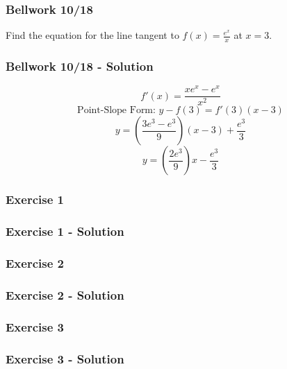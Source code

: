 \documentclass[12pt]{beamer}
\begin{document}
\begin{frame}
	\frametitle{Bellwork 10/18}
	\initclock

	\vfill
	\vfill
	\vfill
	\vfill
	\vfill
	\Large
	Find the equation for the line tangent to $f(x)=\frac{e^x}{x}$ at $x = 3$.
	\vfill
	\vfill
	\vfill
	\vfill
	\vfill
	\vfill
	\vfill
	\vfill

	\small
	\crono
\end{frame}
\begin{frame}
	\frametitle{Bellwork 10/18 - Solution}

	\large
	\vfill
	\vfill
	\vfill
	\vfill
	\vfill
	\vfill
	\[f'(x)=\frac{xe^x-e^x}{x^2}\]
	\vfill
	\[\text{Point-Slope Form: }y-f(3)=f'(3)(x-3)\]
	\[y=\left(\frac{3e^3-e^3}{9}\right)(x-3)+\frac{e^3}{3}\]
	\[\boxed{y=\left(\frac{2e^3}{9}\right)x-\frac{e^3}{3}}\]
\end{frame}
\begin{frame}
	\frametitle{Exercise 1}

	
\end{frame}
\begin{frame}
	\frametitle{Exercise 1 - Solution}

	
\end{frame}
\begin{frame}
	\frametitle{Exercise 2}

	
\end{frame}
\begin{frame}
	\frametitle{Exercise 2 - Solution}

	
\end{frame}
\begin{frame}
	\frametitle{Exercise 3}

	
\end{frame}
\begin{frame}
	\frametitle{Exercise 3 - Solution}

	
\end{frame}
\end{document}

